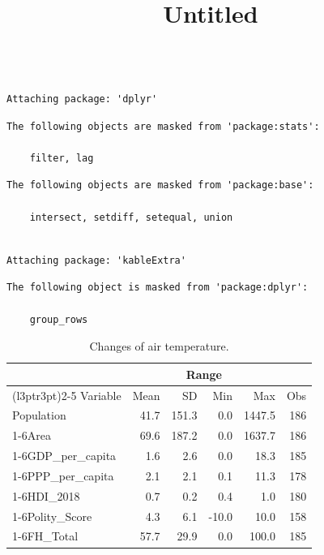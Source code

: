 \documentclass[
  japanese,
  letterpaper,
  DIV=11,
  numbers=noendperiod]{scrartcl}
\title{Untitled}
\author{}
\date{}
\begin{document}
\maketitle


\begin{verbatim}

Attaching package: 'dplyr'
\end{verbatim}

\begin{verbatim}
The following objects are masked from 'package:stats':

    filter, lag
\end{verbatim}

\begin{verbatim}
The following objects are masked from 'package:base':

    intersect, setdiff, setequal, union
\end{verbatim}

\begin{verbatim}

Attaching package: 'kableExtra'
\end{verbatim}

\begin{verbatim}
The following object is masked from 'package:dplyr':

    group_rows
\end{verbatim}

\begin{longtable}[t]{lrrrrr}
\caption{\label{tab:unnamed-chunk-1}Changes of air temperature.}\\
\toprule
\multicolumn{1}{c}{ } & \multicolumn{4}{c}{Range} & \multicolumn{1}{c}{ } \\
\cmidrule(l{3pt}r{3pt}){2-5}
Variable & Mean & SD & Min & Max & Obs\\
\midrule
Population & 41.7 & 151.3 & 0.0 & 1447.5 & 186\\
\cmidrule{1-6}\pagebreak[0]
Area & 69.6 & 187.2 & 0.0 & 1637.7 & 186\\
\cmidrule{1-6}\pagebreak[0]
GDP\_per\_capita & 1.6 & 2.6 & 0.0 & 18.3 & 185\\
\cmidrule{1-6}\pagebreak[0]
PPP\_per\_capita & 2.1 & 2.1 & 0.1 & 11.3 & 178\\
\cmidrule{1-6}\pagebreak[0]
HDI\_2018 & 0.7 & 0.2 & 0.4 & 1.0 & 180\\
\cmidrule{1-6}\pagebreak[0]
Polity\_Score & 4.3 & 6.1 & -10.0 & 10.0 & 158\\
\cmidrule{1-6}\pagebreak[0]
FH\_Total & 57.7 & 29.9 & 0.0 & 100.0 & 185\\
\bottomrule
\end{longtable}
\end{document}
